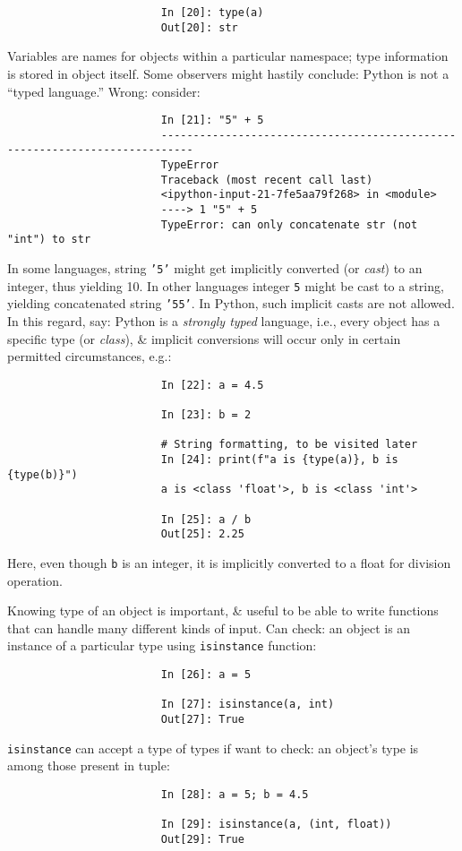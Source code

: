 \documentclass{article}
\begin{document}
\begin{enumerate}
\begin{itemize}
\begin{itemize}
\begin{itemize}
\begin{itemize}
\begin{verbatim}
						In [20]: type(a)
						Out[20]: str
					\end{verbatim}
					Variables are names for objects within a particular namespace; type information is stored in object itself. Some observers might hastily conclude: Python is not a ``typed language.'' Wrong: consider:
					\begin{verbatim}
						In [21]: "5" + 5
						---------------------------------------------------------------------------
						TypeError
						Traceback (most recent call last)
						<ipython-input-21-7fe5aa79f268> in <module>
						----> 1 "5" + 5
						TypeError: can only concatenate str (not "int") to str
					\end{verbatim}
					In some languages, string {\tt'5'} might get implicitly converted (or {\it cast}) to an integer, thus yielding 10. In other languages integer {\tt5} might be cast to a string, yielding concatenated string {\tt'55'}. In Python, such implicit casts are not allowed. In this regard, say: Python is a {\it strongly typed} language, i.e., every object has a specific type (or {\it class}), \& implicit conversions will occur only in certain permitted circumstances, e.g.:
					\begin{verbatim}
						In [22]: a = 4.5
						
						In [23]: b = 2
						
						# String formatting, to be visited later
						In [24]: print(f"a is {type(a)}, b is {type(b)}")
						a is <class 'float'>, b is <class 'int'>
						
						In [25]: a / b
						Out[25]: 2.25
					\end{verbatim}
					Here, even though {\tt b} is an integer, it is implicitly converted to a float for division operation.
					
					Knowing type of an object is important, \& useful to be able to write functions that can handle many different kinds of input. Can check: an object is an instance of a particular type using {\tt isinstance} function:
					\begin{verbatim}
						In [26]: a = 5
						
						In [27]: isinstance(a, int)
						Out[27]: True
					\end{verbatim}
					{\tt isinstance} can accept a type of types if want to check: an object's type is among those present in tuple:
					\begin{verbatim}
						In [28]: a = 5; b = 4.5
						
						In [29]: isinstance(a, (int, float))
						Out[29]: True
						

\end{verbatim}
\end{itemize}
\end{itemize}
\end{itemize}
\end{itemize}
\end{enumerate}
\end{document}
